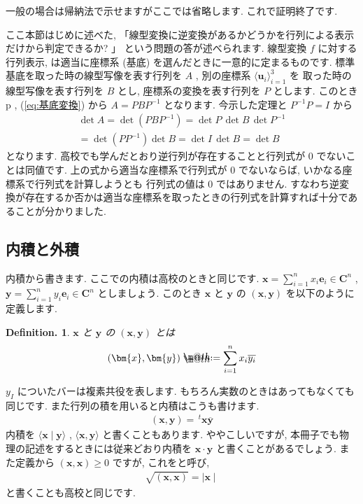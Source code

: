 \documentclass[openany, a4paper, oneside]{book}
\makeatletter
\newcommand*{\defeq}{\mathrel{\rlap{%
\raisebox{0.3ex}{$\m@th\cdot$}}%
\raisebox{-0.3ex}{$\m@th\cdot$}}%
=}
\theoremstyle{break}
\theoremstyle{breakdefn}
\newtheorem{defn}[thm]{Definition.}
\makeatother
\begin{document}
一般の場合は帰納法で示せますがここでは省略します.
これで証明終了です.

ここ本節はじめに述べた, 「線型変換に逆変換があるかどうかを行列による表示だけから判定できるか? 」
という問題の答が述べられます.
線型変換 $f$ に対する行列表示, は適当に座標系 (基底) を選んだときに一意的に定まるものです.
標準基底を取った時の線型写像を表す行列を $A$ , 別の座標系 $\langle \bm{u}_i \rangle _{i=1}^3$ を
取った時の線型写像を表す行列を $B$ とし,
座標系の変換を表す行列を $P$ とします.
このとき p \pageref{eq:基底変換}, (\ref{eq:基底変換}) から $A = PBP^{-1}$ となります.
今示した定理と $P^{-1} P = I$ から
    \begin{gather}
        \det A
        =
        \det ( P B P^{-1} )
        =
        \det P \, \det B \, \det P^{-1} \\
        =
        \det ( P P^{-1} ) \det B
        =
        \det I \, \det B
        =
        \det B
    \end{gather}
となります.
高校でも学んだとおり逆行列が存在することと行列式が $0$ でないことは同値です.
上の式から適当な座標系で行列式が $0$ でないならば, いかなる座標系で行列式を計算しようとも
行列式の値は $0$ ではありません.
すなわち逆変換が存在するか否かは適当な座標系を取ったときの行列式を計算すれば十分であることが分かりました.
\subsection{内積と外積}
\label{sec-4-3-2-5}

内積から書きます.
ここでの内積は高校のときと同じです.
$\bm{x}= \sum_{i=1}^n x_{i}\bm{e}_{i} \in \bm{C}^n$  , $\bm{y} = \sum_{i=1}^n y_{i}\bm{e}_{i} \in \bm{C}^n$ としましょう.
このとき $\bm{x}$ と $\bm{y}$ の $(\bm{x}, \bm{y})$ を以下のように定義します.
\begin{defn} $\bm{x}$ と $\bm{y}$ の $(\bm{x}, \bm{y})$ とは
\begin{align}
(\bm{x}, \bm{y} ) \defeq \sum_{i=1}^n x_{i} \overline {y_{i}}
\end{align}
\end{defn}
$y_{I}$ についたバーは複素共役を表します.
もちろん実数のときはあってもなくても同じです.
また行列の積を用いると内積はこうも書けます.
    \begin{align}
        (\bm{x},\bm{y}) = \, ^{t}\bm{x} \overline{\bm{y}}
    \end{align}
内積を $\langle \bm{x} \mid \bm{y} \rangle$ ,  $\langle \bm{x},\bm{y} \rangle$ と書くこともあります.
ややこしいですが, 本冊子でも物理の記述をするときには従来どおり内積を $\bm{x} \cdot \bm{y}$ と書くことがあるでしょう.
また定義から $(\bm{x},\bm{x})\geq 0$ ですが, これをと呼び,
    \begin{align}
        \sqrt{(\bm{x},\bm{x})}=\mid \bm{x} \mid
    \end{align}
と書くことも高校と同じです.
\end{document}
